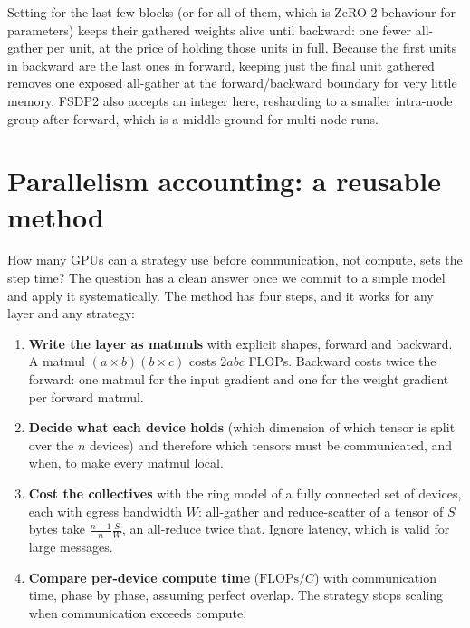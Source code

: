 \begin{deepdive}
Setting  for the last few blocks (or for all of them, which
is ZeRO-2 behaviour for parameters) keeps their gathered weights alive until backward: one fewer
all-gather per unit, at the price of holding those units in full. Because the first units in
backward are the last ones in forward, keeping just the final unit gathered removes one exposed
all-gather at the forward/backward boundary for very little memory. FSDP2 also accepts an integer
here, resharding to a smaller intra-node group after forward, which is a middle ground for
multi-node runs.
\end{deepdive}

\section{Parallelism accounting: a reusable method}\label{sec:sharding:accounting}

How many GPUs can a strategy use before communication, not compute, sets the step time? The
question has a clean answer once we commit to a simple model and apply it systematically. The
method has four steps, and it works for any layer and any strategy:

\begin{enumerate}
  \item \textbf{Write the layer as matmuls} with explicit shapes, forward and backward. A matmul
    $(a\times b)(b\times c)$ costs $2abc$ FLOPs. Backward costs twice the forward: one matmul for the
    input gradient and one for the weight gradient per forward matmul.
  \item \textbf{Decide what each device holds} (which dimension of which tensor is split over
    the $n$ devices) and therefore which tensors must be communicated, and when, to make every
    matmul local.
  \item \textbf{Cost the collectives} with the ring model of a fully connected set of devices, each
    with egress bandwidth $W$: all-gather and reduce-scatter of a tensor of $S$ bytes take
    $\frac{n-1}{n}\frac{S}{W}$, an all-reduce twice that. Ignore latency, which is valid for large
    messages.
  \item \textbf{Compare per-device compute time} ($\text{FLOPs}/C$) with communication time, phase
    by phase, assuming perfect overlap. The strategy stops scaling when communication exceeds
    compute.
\end{enumerate}

